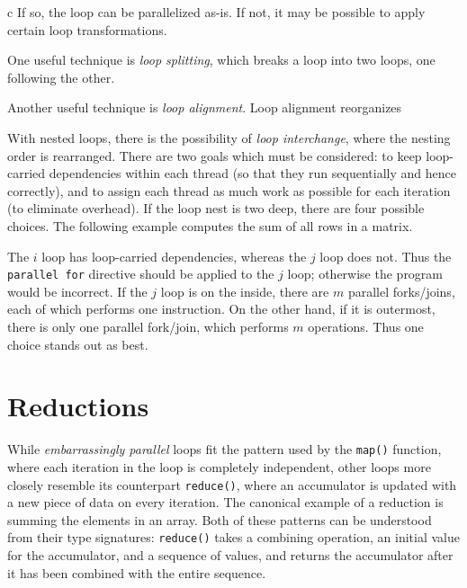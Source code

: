 \documentclass[conference, a4paper]{IEEEtran-modified}
\begin{document}
\begin{ccode}[]{c}
  If so, the loop can be parallelized as-is. If not, it may be possible to apply certain loop transformations.

  One useful technique is \emph{loop splitting}, which breaks a loop into two loops, one following the other. 

  Another useful technique is \emph{loop alignment}. Loop alignment reorganizes 

  With nested loops, there is the possibility of \emph{loop interchange}, where the nesting order is rearranged. There are two goals which must be considered: to keep loop-carried dependencies within each thread (so that they run sequentially and hence correctly), and to assign each thread as much work as possible for each iteration (to eliminate overhead). If the loop nest is two deep, there are four possible choices. The following example computes the sum of all rows in a matrix.



  The $i$ loop has loop-carried dependencies, whereas the $j$ loop does not. Thus the \texttt{parallel for} directive should be applied to the $j$ loop; otherwise the program would be incorrect. If the $j$ loop is on the inside, there are $m$ parallel forks/joins, each of which performs one instruction. On the other hand, if it is outermost, there is only one parallel fork/join, which performs $m$ operations. Thus one choice stands out as best.


\section{Reductions}

While \emph{embarrassingly parallel} loops fit the pattern used by the \texttt{map()} function, where each iteration in the loop is completely independent, other loops more closely resemble its counterpart \texttt{reduce()}, where an accumulator is updated with a new piece of data on every iteration. The canonical example of a reduction is summing the elements in an array. Both of these patterns can be understood from their type signatures: \texttt{reduce()} takes a combining operation, an initial value for the accumulator, and a sequence of values, and returns the accumulator after it has been combined with the entire sequence.


\end{ccode}
\end{document}
